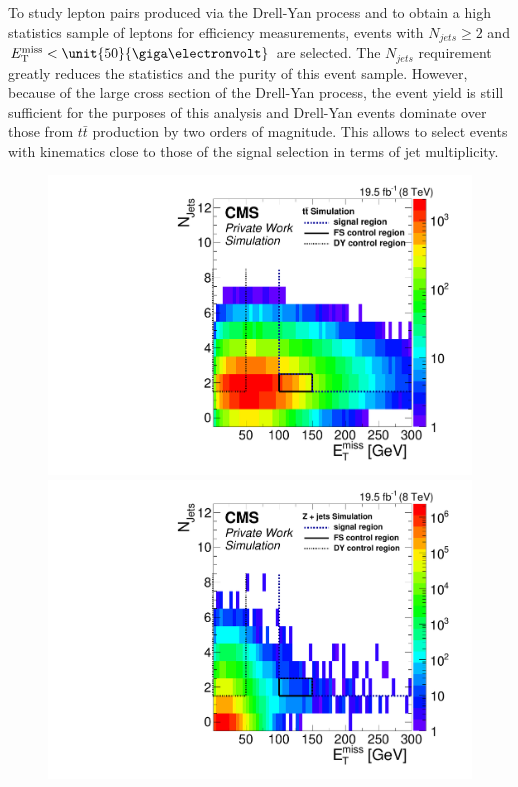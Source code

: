 To study lepton pairs produced via the Drell-Yan process and to obtain a high statistics sample of leptons for efficiency measurements, events with $N_{jets} \geq 2$ and $\MET < \unit{50}{\giga\electronvolt}$ are selected. The $N_{jets}$ requirement greatly reduces the statistics and the purity of this event sample. However, because of the large cross section of the Drell-Yan process, the event yield is still sufficient for the purposes of this analysis and Drell-Yan events dominate over those from $t\bar{t}$ production by two orders of magnitude. This allows to select events with kinematics close to those of the signal selection in terms of jet multiplicity.
\begin{figure}[htbp]
\centering
\begin{minipage}[t]{0.49\textwidth}
  \includegraphics[width=\textwidth]{plots/SELECTION/metJetsScatter_ttbar.pdf}
\end{minipage}
\begin{minipage}[t]{0.49\textwidth}
\includegraphics[width=\textwidth]{plots/SELECTION/metJetsScatter_DY.pdf}

\end{minipage}
\end{figure}
